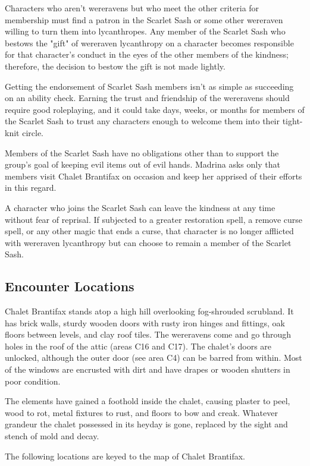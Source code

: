 \documentclass[10pt,a4paper,twoside,bg=print,twocolumn,openany,nodeprecatedcode]{dndbook}
\begin{document}
Characters who aren't wereravens but who meet the other criteria for membership must find a patron in the Scarlet Sash or some other wereraven willing to turn them into lycanthropes. Any member of the Scarlet Sash who bestows the "gift" of wereraven lycanthropy on a character becomes responsible for that character's conduct in the eyes of the other members of the kindness; therefore, the decision to bestow the gift is not made lightly.

Getting the endorsement of Scarlet Sash members isn't as simple as succeeding on an ability check. Earning the trust and friendship of the wereravens should require good roleplaying, and it could take days, weeks, or months for members of the Scarlet Sash to trust any characters enough to welcome them into their tight-knit circle.

Members of the Scarlet Sash have no obligations other than to support the group's goal of keeping evil items out of evil hands. Madrina asks only that members visit Chalet Brantifax on occasion and keep her apprised of their efforts in this regard.

A character who joins the Scarlet Sash can leave the kindness at any time without fear of reprisal. If subjected to a greater restoration spell, a remove curse spell, or any other magic that ends a curse, that character is no longer afflicted with wereraven lycanthropy but can choose to remain a member of the Scarlet Sash.

\subsection{Encounter Locations}
Chalet Brantifax stands atop a high hill overlooking fog-shrouded scrubland. It has brick walls, sturdy wooden doors with rusty iron hinges and fittings, oak floors between levels, and clay roof tiles. The wereravens come and go through holes in the roof of the attic (areas C16 and C17). The chalet's doors are unlocked, although the outer door (see area C4) can be barred from within. Most of the windows are encrusted with dirt and have drapes or wooden shutters in poor condition.

The elements have gained a foothold inside the chalet, causing plaster to peel, wood to rot, metal fixtures to rust, and floors to bow and creak. Whatever grandeur the chalet possessed in its heyday is gone, replaced by the sight and stench of mold and decay.

The following locations are keyed to the map of Chalet Brantifax.
\end{document}
